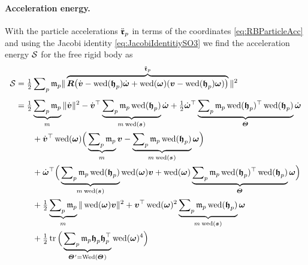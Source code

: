 \paragraph{Acceleration energy.}
With the particle accelerations $\ddot{\boldsymbol{\mathfrak{r}}}_{p}$ in terms of the coordinates \eqref{eq:RBParticleAcc} and using the Jacobi identity \eqref{eq:JacobiIdentitiySO3} we find the acceleration energy $\mathcal{S}$ for the free rigid body as
\begin{align}\label{eq:RigidBodyAccEnergy}
 \accEnergy &= \tfrac{1}{2} \sumParticles \particleMass{\PidxI} \norm{\overbrace{\R \big( \vd - \wedOp(\particleBodyPos{\PidxI})\wdot + \wedOp(\w)(\v - \wedOp(\particleBodyPos{\PidxI})\w) \big)}^{\particlePosdd{\PidxI}}}^2
\nonumber\\[1ex]
 &= \tfrac{1}{2} \underbrace{\sumParticles \particleMass{\PidxI}}_{\bodyMass{}{}} \norm{\vd}^2
  - \vd^\top \underbrace{\sumParticles \particleMass{\PidxI} \wedOp(\particleBodyPos{\PidxI})}_{\bodyMass{}{} \wedOp(\bodyCOM{}{})} \wdot
  + \tfrac{1}{2} \wdot^\top \underbrace{\sumParticles \particleMass{\PidxI} \wedOp(\particleBodyPos{\PidxI})^\top \wedOp(\particleBodyPos{\PidxI})}_{\bodyMOI{}{}} \wdot
\nonumber\\
 &\qquad+ \vd^\top \wedOp(\w) \Big( \underbrace{\sumParticles \particleMass{\PidxI}}_{\bodyMass{}{}}\v - \underbrace{\sumParticles \particleMass{\PidxI} \wedOp(\particleBodyPos{\PidxI})}_{\bodyMass{}{} \wedOp(\bodyCOM{}{})} \w \Big)
\nonumber\\
 &\qquad+ \wdot^\top \Big( \underbrace{\sumParticles \particleMass{\PidxI} \wedOp(\particleBodyPos{\PidxI})}_{\bodyMass{}{} \wedOp(\bodyCOM{}{})} \wedOp(\w) \v +  \wedOp(\w) \underbrace{\sumParticles \particleMass{\PidxI} \wedOp(\particleBodyPos{\PidxI})^\top \wedOp(\particleBodyPos{\PidxI})}_{\bodyMOI{}{}} \w \Big)
\nonumber\\
 &\qquad+ \tfrac{1}{2} \underbrace{\sumParticles \particleMass{\PidxI}}_{\bodyMass{}{}} \norm{\wedOp(\w)\v}^2
 + \v^\top \wedOp(\w)^2 \underbrace{\sumParticles \particleMass{\PidxI} \wedOp(\particleBodyPos{\PidxI})}_{\bodyMass{}{} \wedOp(\bodyCOM{}{})} \w
\nonumber\\
 &\qquad+ \tfrac{1}{2} \tr \Big( \underbrace{\sumParticles \particleMass{\PidxI} \particleBodyPos{\PidxI} \particleBodyPos{\PidxI}^\top}_{\bodyMOIp{}{} = \wedMatOp(\bodyMOI{}{})} \wedOp(\w)^4 \Big)
\end{align}
